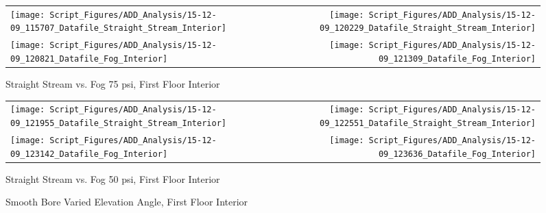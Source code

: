 \documentclass{article}
\begin{document}
\clearpage

\begin{figure}[ht]
\begin{tabular*}{\textwidth}{lr}
\texttt{[image: Script\_Figures/ADD\_Analysis/15-12-09\_115707\_Datafile\_Straight\_Stream\_Interior]} &
\texttt{[image: Script\_Figures/ADD\_Analysis/15-12-09\_120229\_Datafile\_Straight\_Stream\_Interior]} \\
\texttt{[image: Script\_Figures/ADD\_Analysis/15-12-09\_120821\_Datafile\_Fog\_Interior]} &
\texttt{[image: Script\_Figures/ADD\_Analysis/15-12-09\_121309\_Datafile\_Fog\_Interior]} \\
\end{tabular*}
\caption{Straight Stream vs. Fog 75 psi, First Floor Interior}
\label{fig:Straight Stream vs. Fog 75 psi, First Floor Interior}
\end{figure}

\clearpage

\begin{figure}[ht]
\begin{tabular*}{\textwidth}{lr}
\texttt{[image: Script\_Figures/ADD\_Analysis/15-12-09\_121955\_Datafile\_Straight\_Stream\_Interior]} &
\texttt{[image: Script\_Figures/ADD\_Analysis/15-12-09\_122551\_Datafile\_Straight\_Stream\_Interior]} \\
\texttt{[image: Script\_Figures/ADD\_Analysis/15-12-09\_123142\_Datafile\_Fog\_Interior]} &
\texttt{[image: Script\_Figures/ADD\_Analysis/15-12-09\_123636\_Datafile\_Fog\_Interior]} \\
\end{tabular*}
\caption{Straight Stream vs. Fog 50 psi, First Floor Interior}
\label{fig:Straight Stream vs. Fog 50 psi, First Floor Interior}
\end{figure}

\clearpage

\begin{figure}[ht]
\centering
{}
\caption{Smooth Bore Varied Elevation Angle, First Floor Interior}
\label{fig:Smooth Bore Varied Elevation Angle, First Floor Interior}
\end{figure}
\end{document}
